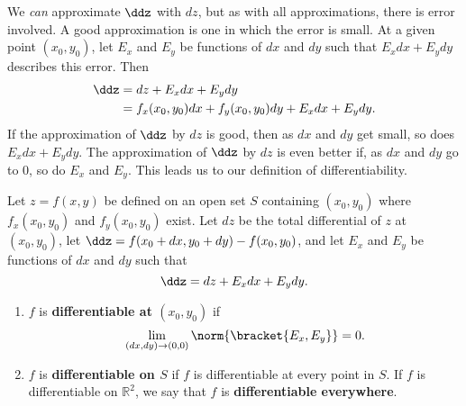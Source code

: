 We \emph{can} approximate $\ddz$ with $dz$, but as with all approximations, there is error involved. A good approximation is one in which the error is small. At a given point $(x_0,y_0)$, let $E_x$ and $E_y$ be functions of $dx$ and $dy$ such that $E_xdx+E_ydy$ describes this error. Then
\begin{align*}
\ddz &= dz + E_xdx+ E_ydy \\
		&= f_x(x_0,y_0)dx+f_y(x_0,y_0)dy + E_xdx+E_ydy.
\end{align*}
If the approximation of $\ddz$ by $dz$ is good, then as $dx$ and $dy$ get small,  so does $E_xdx+E_ydy$. The approximation of $\ddz$ by $dz$ is even better if, as $dx$ and $dy$ go to 0, so do $E_x$ and $E_y$. This leads us to our definition of differentiability.

{Let $z=f(x,y)$ be defined on an open set $S$ containing $(x_0,y_0)$ where $f_x(x_0,y_0)$ and $f_y(x_0,y_0)$ exist. Let $dz$ be the total differential of $z$ at $(x_0,y_0)$, let $\ddz = f(x_0+dx,y_0+dy) - f(x_0,y_0)$, and let $E_x$ and $E_y$ be functions of $dx$ and $dy$  such that 
\[\ddz = dz + E_xdx + E_ydy.\]
\begin{enumerate}
	\item $f$ is \textbf{differentiable at $(x_0,y_0)$} if%
	\[\lim_{(dx,dy)\to(0,0)}\norm{\bracket{E_x,E_y}}=0.\]
	\item	$f$ is \textbf{differentiable on $S$} if $f$ is differentiable at every point in $S$. If $f$ is differentiable on $\mathbb{R}^2$, we say that $f$ is \textbf{differentiable everywhere}.
\end{enumerate}
}

